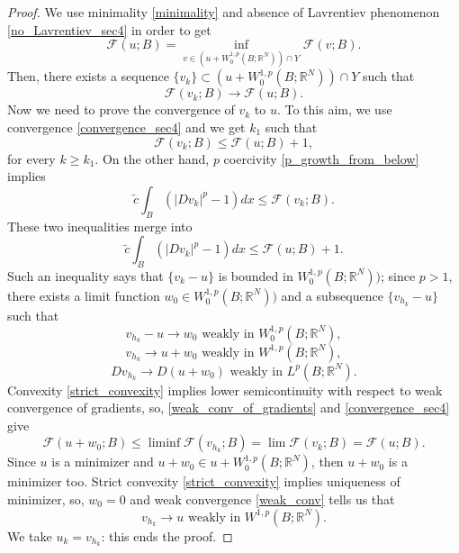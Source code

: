 \documentclass[10pt,a4paper]{amsart}
\begin{document}
\begin{proof}

\noindent
We use minimality \eqref{minimality} and absence of Lavrentiev phenomenon \eqref{no_Lavrentiev_sec4} in order to get 
$$
\mathcal{F}(u;B) = \inf_{v \in (u + W^{1,p}_0(B;\mathbb{R}^N)) \cap Y} \mathcal{F}(v;B).
$$
Then, there exists a sequence  $\{v_k\} \subset (u + W^{1,p}_0(B;\mathbb{R}^N)) \cap Y$ such that 
\begin{equation}
\label{convergence_sec4}
\mathcal{F}(v_k;B) \to \mathcal{F}(u;B).
\end{equation}
Now we need to prove the convergence of $v_k$ to $u$. To this aim, we use  
convergence \eqref{convergence_sec4} and we get $k_1$ such that
$$
 \mathcal{F}(v_k;B) \leq  \mathcal{F}(u;B) + 1,
$$
for every $k \geq k_1$. On the other hand, 
$p$ coercivity \eqref{p_growth_from_below} implies
$$
\tilde{c} \int_B (|Dv_k|^p - 1) dx \leq \mathcal{F}(v_k;B).
$$
These two inequalities merge into
$$
\tilde{c} \int_B (|Dv_k|^p - 1) dx \leq \mathcal{F}(u;B) + 1.
$$
Such an inequality says that $\{v_k - u \}$ is bounded in $W^{1,p}_0(B;\mathbb{R}^N))$; since $p>1$, there exists a limit function $w_0 \in W^{1,p}_0(B;\mathbb{R}^N))$ and a subsequence 
$\{v_{h_k} - u \}$ such that
$$
v_{h_k} - u \to w_0 \text{ weakly in } W^{1,p}_0(B;\mathbb{R}^N),
$$
\begin{equation}
\label{weak_conv}
v_{h_k}  \to u + w_0 \text{ weakly in } W^{1,p}(B;\mathbb{R}^N),
\end{equation}
\begin{equation}
\label{weak_conv_of_gradients}
Dv_{h_k}  \to D(u + w_0) \text{ weakly in } L^{p}(B;\mathbb{R}^N).
\end{equation}
Convexity \eqref{strict_convexity} implies lower semicontinuity with respect to weak convergence of gradients, so, \eqref{weak_conv_of_gradients} and \eqref{convergence_sec4} give
$$
\mathcal{F}(u + w_0;B) \leq \liminf \mathcal{F}(v_{h_k};B) 
= \lim \mathcal{F}(v_{k};B) = \mathcal{F}(u;B).
$$
Since $u$ is a minimizer and $u + w_0 \in u + W^{1,p}_0(B;\mathbb{R}^N)$, then $u + w_0$ is a minimizer too. Strict convexity \eqref{strict_convexity} implies uniqueness of minimizer, so, $w_0 = 0$ and weak convergence \eqref{weak_conv} tells us that
$$
v_{h_k}  \to u  \text{ weakly in } W^{1,p}(B;\mathbb{R}^N).
$$
We take $u_k = v_{h_k}$: this ends the proof.
\end{proof}
\end{document}
